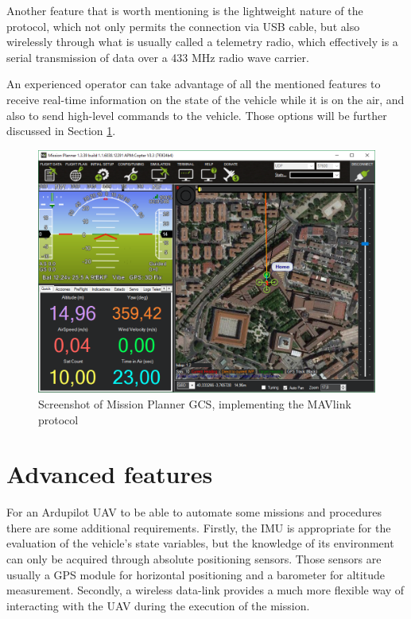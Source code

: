 Another feature that is worth mentioning is the lightweight nature of the protocol, which not only permits the connection via USB cable, but also wirelessly through what is usually called a telemetry radio, which effectively is a serial transmission of data over a 433 MHz radio wave carrier.

An experienced operator can take advantage of all the mentioned features to receive real-time information on the state of the vehicle while it is on the air, and also to send high-level commands to the vehicle.
Those options will be further discussed in Section \ref{sec:advanced}.

\begin{figure}[htbp]
	\centering
	\includegraphics[width=\textwidth]{./figures/missionplanner.png}
	\caption{Screenshot of Mission Planner GCS, implementing the MAVlink protocol}
	\label{fig:missionplanner}
\end{figure}

\section{Advanced features}\label{sec:advanced}

For an Ardupilot UAV to be able to automate some missions and procedures there are some additional requirements.
Firstly, the IMU is appropriate for the evaluation of the vehicle's state variables, but the knowledge of its environment can only be acquired through absolute positioning sensors.
Those sensors are usually a GPS module for horizontal positioning and a barometer for altitude measurement.
Secondly, a wireless data-link provides a much more flexible way of interacting with the UAV during the execution of the mission.

